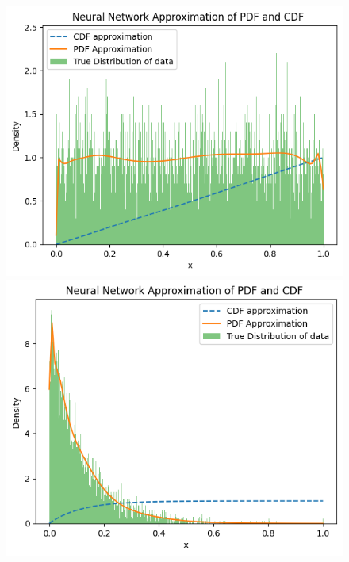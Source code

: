 \begin{figure}[h]
\vspace{1em}

\begin{minipage}{0.45\textwidth}
\centering
\includegraphics[width=\textwidth]{5ResultsDiscussion/pictures/MarginalTest/UniformHistogram.png}
\end{minipage}
\hfill
\begin{minipage}{0.45\textwidth}
\centering
\includegraphics[width=\textwidth]{5ResultsDiscussion/pictures/MarginalTest/ExponentialHistogram.png}
\end{minipage}


\end{figure}

